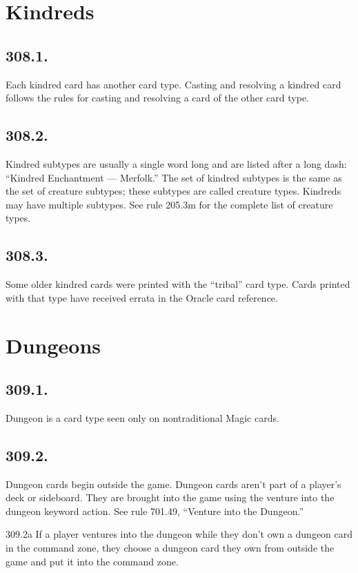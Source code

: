 \section{Kindreds}
\subsection*{308.1.}
Each kindred card has another card type. Casting and resolving a kindred card follows the rules for casting and resolving a card of the other card type.

\subsection*{308.2.}
Kindred subtypes are usually a single word long and are listed after a long dash: “Kindred Enchantment — Merfolk.” The set of kindred subtypes is the same as the set of creature subtypes; these subtypes are called creature types. Kindreds may have multiple subtypes. See rule 205.3m for the complete list of creature types.

\subsection*{308.3.}
Some older kindred cards were printed with the “tribal” card type. Cards printed with that type have received errata in the Oracle card reference.

\section{Dungeons}
\subsection*{309.1.}
Dungeon is a card type seen only on nontraditional Magic cards.

\subsection*{309.2.}
Dungeon cards begin outside the game. Dungeon cards aren’t part of a player’s deck or sideboard. They are brought into the game using the venture into the dungeon keyword action. See rule 701.49, “Venture into the Dungeon.”

309.2a If a player ventures into the dungeon while they don’t own a dungeon card in the command zone, they choose a dungeon card they own from outside the game and put it into the command zone.


